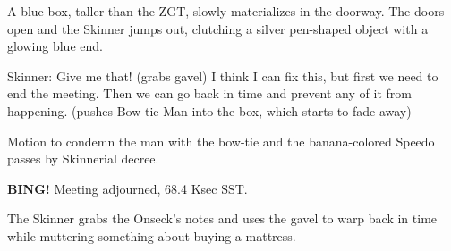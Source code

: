\documentclass[10pt]{article}
\newcommand{\bing}{{\bf BING!} }
\begin{document}
A blue box, taller than the ZGT, slowly materializes in the doorway.  The doors open and the
Skinner jumps out, clutching a silver pen-shaped object with a glowing blue end.

Skinner: Give me that!  (grabs gavel) I think I can fix this, but first we need to end the
meeting.  Then we can go back in time and prevent any of it from happening.  (pushes Bow-tie
Man into the box, which starts to fade away)

Motion to condemn the man with the bow-tie and the banana-colored Speedo passes by Skinnerial decree.

\bing
\noindent
Meeting adjourned, 68.4 Ksec SST.

The Skinner grabs the Onseck's notes and uses the gavel to warp back in time while muttering
something about buying a mattress.
\end{document}
